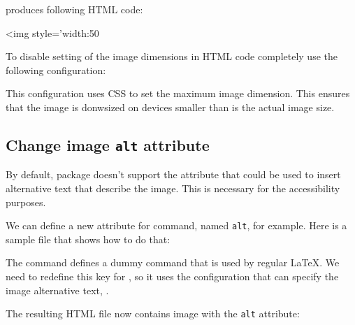 produces following HTML code:

\begin{htmlsource}
<img style='width:50%
\end{htmlsource}

To disable setting of the image dimensions in HTML code completely
use the following configuration:

\begin{texsource}

\EndPreamble
\end{texsource}

This configuration uses CSS to set the maximum image dimension. This ensures that
the image is donwsized on devices smaller than is the actual image size.


\subsection{Change image \texttt{alt} attribute}

By default,  package doesn't support the attribute that could
be used to insert alternative text that describe the image. This is necessary
for the accessibility purposes.

We can define a new attribute for  command, named
\texttt{alt}, for example. Here is a sample file that shows how to do that:


The  command defines a dummy command that
is used by regular \LaTeX. We need to redefine this key for \texfourht, so it uses the
configuration that can specify the image alternative text, .


The resulting HTML file now contains image with the \texttt{alt} attribute:

